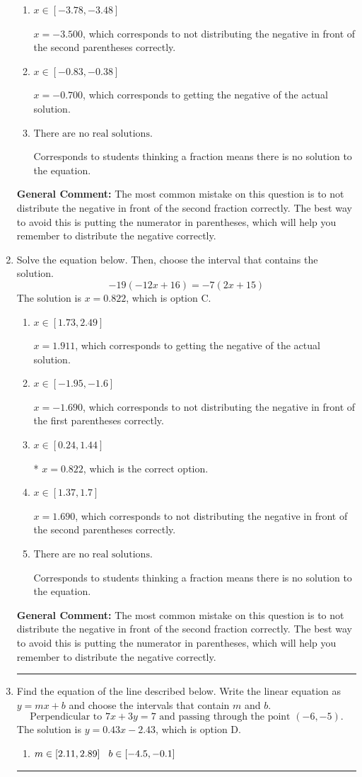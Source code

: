 \documentclass{extbook}[14pt]
\newcommand{\litem}[1]{\item #1

\rule{\textwidth}{0.4pt}}
\begin{document}
\begin{enumerate}
{\begin{enumerate}[label=\Alph*.]
* $x = -0.167$, which is the correct option.
\item \( x \in [-3.78, -3.48] \)

$x = -3.500$, which corresponds to not distributing the negative in front of the second parentheses correctly.
\item \( x \in [-0.83, -0.38] \)

$x = -0.700$, which corresponds to getting the negative of the actual solution.
\item \( \text{There are no real solutions.} \)

Corresponds to students thinking a fraction means there is no solution to the equation.
\end{enumerate}

\textbf{General Comment:} The most common mistake on this question is to not distribute the negative in front of the second fraction correctly. The best way to avoid this is putting the numerator in parentheses, which will help you remember to distribute the negative correctly.
}
\litem{
Solve the equation below. Then, choose the interval that contains the solution.
\[ -19(-12x + 16) = -7(2x + 15) \]The solution is \( x = 0.822 \), which is option C.\begin{enumerate}[label=\Alph*.]
\item \( x \in [1.73, 2.49] \)

$x = 1.911$, which corresponds to getting the negative of the actual solution.
\item \( x \in [-1.95, -1.6] \)

$x = -1.690$, which corresponds to not distributing the negative in front of the first parentheses correctly.
\item \( x \in [0.24, 1.44] \)

* $x = 0.822$, which is the correct option.
\item \( x \in [1.37, 1.7] \)

$x = 1.690$, which corresponds to not distributing the negative in front of the second parentheses correctly.
\item \( \text{There are no real solutions.} \)

Corresponds to students thinking a fraction means there is no solution to the equation.
\end{enumerate}

\textbf{General Comment:} The most common mistake on this question is to not distribute the negative in front of the second fraction correctly. The best way to avoid this is putting the numerator in parentheses, which will help you remember to distribute the negative correctly.
}
\litem{
Find the equation of the line described below. Write the linear equation as $ y=mx+b $ and choose the intervals that contain $m$ and $b$.
\[ \text{Perpendicular to } 7 x + 3 y = 7 \text{ and passing through the point } (-6, -5). \]The solution is \( y = 0.43x - 2.43 \), which is option D.\begin{enumerate}[label=\Alph*.]
\item \( m \in [2.11, 2.89] \hspace*{3mm} b \in [-4.5, -0.1] \)


\end{enumerate}}
\end{enumerate}
\end{document}
